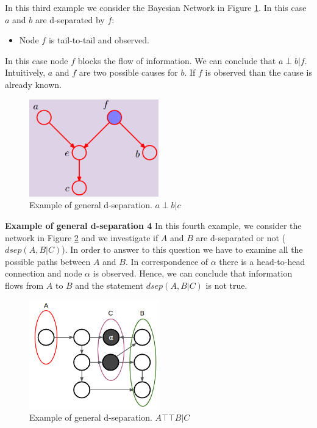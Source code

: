 In this third example we consider the Bayesian Network in Figure \ref{fig:exampleDSeparation2}. In this case $a$ and $b$ are d-separated by $f$:
\begin{itemize}
    \item Node $f$ is tail-to-tail and observed.
\end{itemize}

In this case node $f$ blocks the flow of information. We can conclude that $a \perp b | f$. Intuitively, $a$ and $f$ are two possible causes for $b$. If $f$ is observed than the cause is already known. \newline

\begin{figure}
    \centering
    \includegraphics[width=0.5\textwidth]{images/exampleGeneralDSeparation2.png}
    \caption{Example of general d-separation. $a \perp b | c$ }
    \label{fig:exampleDSeparation2}
\end{figure}

\textbf{Example of general d-separation 4} \newline
In this fourth example, we consider the network in Figure \ref{fig:exampleDSeparation4} and we investigate if $A$ and $B$ are d-separated or not ($\mathit{dsep}(A,B|C)$). In order to answer to this question we have to examine all the possible paths between $A$ and $B$. In correspondence of $\alpha$ there is a head-to-head connection and node $\alpha$ is observed. Hence, we can conclude that information flows from $A$ to $B$ and the statement $\mathit{dsep}(A,B|C)$ is not true. \newline

\begin{figure}
    \centering
    \includegraphics[width=0.5\textwidth]{images/exampleGeneralDSeparation3.png}
    \caption{Example of general d-separation. $A \top\!\!\!\!\top B | C$ }
    \label{fig:exampleDSeparation4}
\end{figure}

